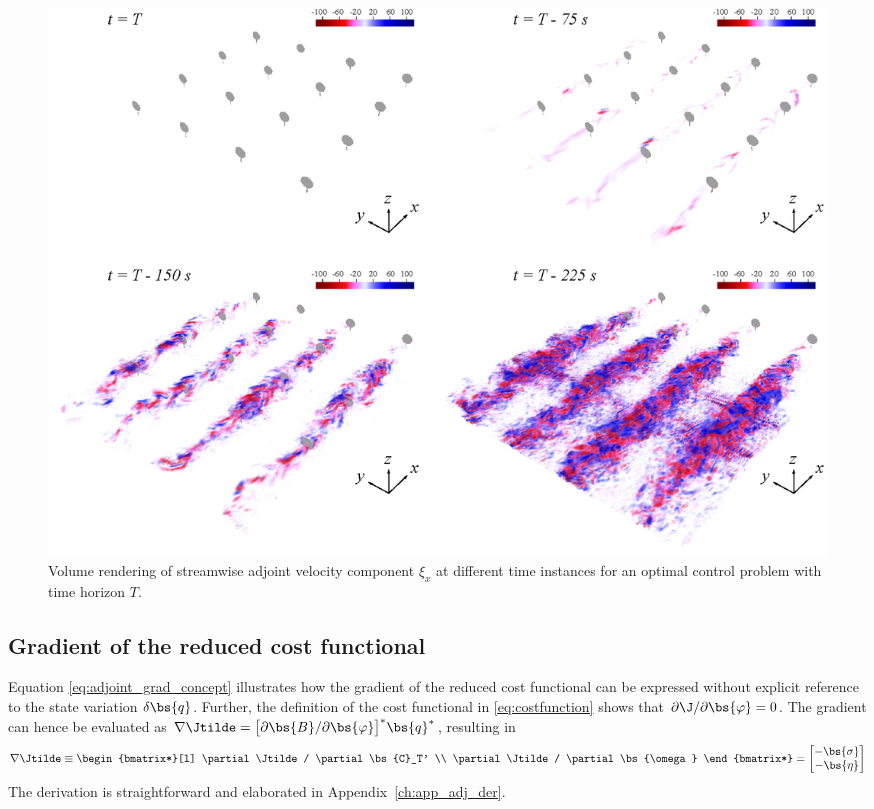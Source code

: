 	\begin{figure}
		\centering
		\includegraphics[width=\textwidth]{chapters/optimal_control_problem/adjoint_3D.eps}
		\caption{Volume rendering of streamwise adjoint velocity component $\xi_x$ at different time instances for an optimal control problem with time horizon $T$. \label{fig:adjoint_3D}}
	\end{figure}


	\subsection{Gradient of the reduced cost functional}\label{sec:problem_gradient2}
	Equation \eqref{eq:adjoint_grad_concept} illustrates how the gradient of the reduced cost functional can be expressed without explicit reference to the state variation $\delta \bs{q}$. Further, the definition of the cost functional in \eqref{eq:costfunction} shows that $\partial \J / \partial \bs{\varphi} = 0$. The gradient can hence be evaluated as $\nabla \Jtilde = \big[ \partial \bs{B} / \partial \bs{\varphi}  \big]^* \bs{q}^*$, resulting in
	\begin{equation}\label{eq:problem_gradient}
		\nabla \Jtilde \equiv 
		\begin{bmatrix*}[l]
			\partial \Jtilde / \partial \bs{C}_T' \\
			\partial \Jtilde / \partial \bs{\omega} 
		\end{bmatrix*} = 
		\begin{bmatrix}
			- \bs{\sigma}\\
			- \bs{\eta}
		\end{bmatrix}
	\end{equation}
	The derivation is straightforward and elaborated in Appendix~\ref{ch:app_adj_der}.
	
